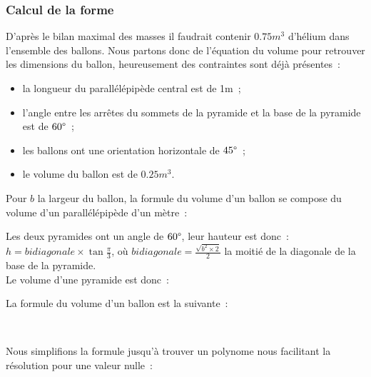 \documentclass[a4paper,11pt]{article}
\begin{document}
\subsubsection{Calcul de la forme}

D'après le bilan maximal des masses il faudrait contenir $0.75m^3$ d'hélium dans l'ensemble des ballons. Nous partons donc de l'équation du volume pour retrouver les dimensions du ballon, heureusement des contraintes sont déjà présentes~:

\begin{itemize}
 \item la longueur du parallélépipède central est de 1m~;
 \item l'angle entre les arrêtes du sommets de la pyramide et la base de la pyramide est de $60 \degree$~;
 \item les ballons ont une orientation horizontale de $45 \degree$~;
 \item le volume du ballon est de $0.25m^3$.
\end{itemize}

\bigbreak

Pour $b$ la largeur du ballon, la formule du volume d'un ballon se compose du volume d'un parallélépipède d'un mètre~:

\begin{center}
\end{center}

Les deux pyramides ont un angle de $60 \degree$, leur hauteur est donc~: $\displaystyle{h = bidiagonale \times \tan{\frac{\pi}{3}}}$, où $\displaystyle{bidiagonale = \frac{\sqrt{b^2 \times 2}}{2}}$ la moitié de la diagonale de la base de la pyramide. \\
Le volume d'une pyramide est donc~:

\begin{center}
\end{center}

La formule du volume d'un ballon est la suivante~:

\begin{center}
	 \\
\end{center}

Nous simplifions la formule jusqu'à trouver un polynome nous facilitant la résolution pour une valeur nulle~:
\end{document}
